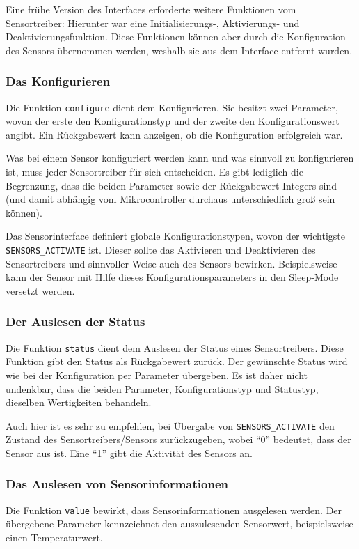	Eine frühe Version des Interfaces erforderte weitere Funktionen
	vom Sensortreiber: Hierunter war eine Initialisierungs-, 
	Aktivierungs- und Deaktivierungsfunktion. Diese Funktionen können aber
	durch die Konfiguration des Sensors übernommen werden,
	weshalb sie aus dem Interface entfernt wurden.

\subsubsection{Das Konfigurieren}
	Die Funktion \lstinline=configure= dient dem Konfigurieren.
	Sie besitzt zwei Parameter, wovon der erste den Konfigurationstyp
	und der zweite den Konfigurationswert angibt.
	Ein Rückgabewert kann anzeigen, ob die Konfiguration erfolgreich war.

	Was bei einem Sensor konfiguriert werden kann und was sinnvoll
	zu konfigurieren ist, muss jeder Sensortreiber für sich entscheiden.
	Es gibt lediglich die Begrenzung, dass die beiden Parameter sowie 
	der Rückgabewert Integers sind (und damit abhängig vom Mikrocontroller
	durchaus unterschiedlich groß sein können).

	Das Sensorinterface definiert globale Konfigurationstypen,
	wovon der wichtigste \lstinline=SENSORS_ACTIVATE= ist.
	Dieser sollte das Aktivieren und Deaktivieren des Sensortreibers
	und sinnvoller Weise auch des Sensors bewirken.
	Beispielsweise kann der Sensor mit Hilfe dieses
	Konfigurationsparameters in den Sleep-Mode versetzt werden.

\subsubsection{Der Auslesen der Status}
	Die Funktion \lstinline=status= dient dem Auslesen der Status
	eines Sensortreibers. Diese Funktion gibt den Status
	als Rückgabewert zurück. Der gewünschte Status wird wie bei der
	Konfiguration per Parameter übergeben. Es ist daher nicht undenkbar,
	dass die beiden Parameter, Konfigurationstyp und Statustyp,
	dieselben Wertigkeiten behandeln.

	Auch hier ist es sehr zu empfehlen,
	bei Übergabe von \lstinline=SENSORS_ACTIVATE= den Zustand des
	Sensortreibers/Sensors zurückzugeben, wobei \enquote{0} bedeutet, dass
	der Sensor aus ist. Eine \enquote{1} gibt die Aktivität des Sensors an.

\subsubsection{Das Auslesen von Sensorinformationen}
	Die Funktion \lstinline=value= bewirkt, dass Sensorinformationen
	ausgelesen werden. Der übergebene Parameter kennzeichnet
	den auszulesenden Sensorwert, beispielsweise einen Temperaturwert.

